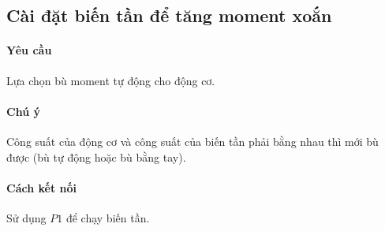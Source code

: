 \documentclass[13pt,a4paper]{extarticle}
\begin{document}
\subsection{Cài đặt biến tần để tăng moment xoắn}
\paragraph{Yêu cầu}Lựa chọn bù moment tự động cho động cơ.
\paragraph{Chú ý}Công suất của động cơ và công suất của biến tần phải bằng nhau thì mới bù được (bù tự động hoặc bù bằng tay).
\paragraph{Cách kết nối}Sử dụng $P1$ để chạy biến tần.
\end{document}
